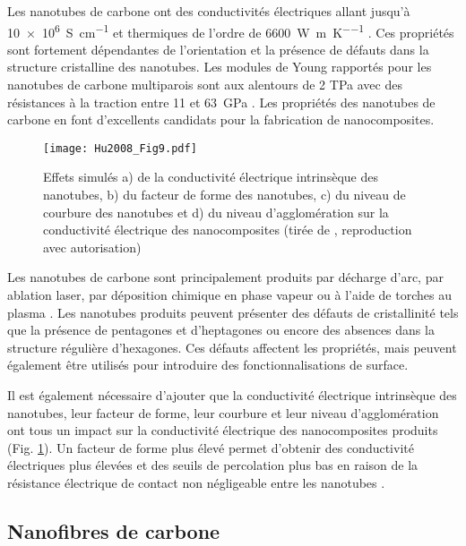 Les nanotubes de carbone ont des conductivités électriques allant jusqu'à \SI[locale=FR]{10e6}{\siemens\per\centi\metre}  \cite{Sathyanarayana2013} et thermiques de l'ordre de \SI[locale=FR]{6600}{\watt\per\metre\per\kelvin} \cite{Berber2000}. 
Ces propriétés sont fortement dépendantes de l'orientation et la présence de défauts dans la structure cristalline des nanotubes. 
Les modules de Young rapportés pour les nanotubes de carbone multiparois sont aux alentours de 2 TPa avec des résistances à la traction entre 11 et \SI[locale=FR]{63}{\giga\pascal} \cite{Mittal2014h}. 
Les propriétés des nanotubes de carbone en font d'excellents candidats pour la fabrication de nanocomposites. 

\begin{figure}[htb]
	\centering
	\texttt{[image: Hu2008\_Fig9.pdf]}
	\caption{Effets simulés a) de la conductivité électrique intrinsèque des nanotubes, b) du facteur de forme des nanotubes, c) du niveau de courbure des nanotubes et d) du niveau d'agglomération sur la conductivité électrique des nanocomposites (tirée de \cite{Hu2008}, reproduction avec autorisation)}
	\label{fig:facteurs_geometriques_CNT}
\end{figure}

\FloatBarrier
Les nanotubes de carbone sont principalement produits par décharge d'arc, par ablation laser, par déposition chimique en phase vapeur \cite{Sathyanarayana2013} ou à l'aide de torches au plasma \cite{Kim2009e}. 
Les nanotubes produits peuvent présenter des défauts de cristallinité tels que la présence de pentagones et d'heptagones ou encore des absences dans la structure régulière d'hexagones. 
Ces défauts affectent les propriétés, mais peuvent également être utilisés pour introduire des fonctionnalisations de surface. 

Il est également nécessaire d'ajouter que la conductivité électrique intrinsèque des nanotubes, leur facteur de forme, leur courbure et leur niveau d'agglomération ont tous un impact sur la conductivité électrique des nanocomposites produits (Fig. \ref{fig:facteurs_geometriques_CNT}). 
Un facteur de forme plus élevé permet d'obtenir des conductivité électriques plus élevées et des seuils de percolation plus bas en raison de la résistance électrique de contact non négligeable entre les nanotubes \cite{Hu2008}. 

\subsection{Nanofibres de carbone}

